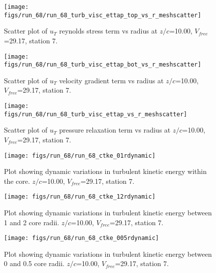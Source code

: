 \begin{figure}[H]
\centering
\texttt{[image: figs/run\_68/run\_68\_turb\_visc\_ettap\_top\_vs\_r\_meshscatter]}
\caption{Scatter plot of $
u_T$ reynolds stress term vs radius at $z/c$=10.00, $V_{free}$=29.17, station 7.}
\label{fig:run_68_turb_visc_ettap_top_vs_r_meshscatter}
\end{figure}


\begin{figure}[H]
\centering
\texttt{[image: figs/run\_68/run\_68\_turb\_visc\_ettap\_bot\_vs\_r\_meshscatter]}
\caption{Scatter plot of $
u_T$ velocity gradient term vs radius at $z/c$=10.00, $V_{free}$=29.17, station 7.}
\label{fig:run_68_turb_visc_ettap_bot_vs_r_meshscatter}
\end{figure}


\begin{figure}[H]
\centering
\texttt{[image: figs/run\_68/run\_68\_turb\_visc\_ettap\_vs\_r\_meshscatter]}
\caption{Scatter plot of $
u_T$ pressure relaxation term vs radius at $z/c$=10.00, $V_{free}$=29.17, station 7.}
\label{fig:run_68_turb_visc_ettap_vs_r_meshscatter}
\end{figure}


\begin{figure}[H]
\centering
\texttt{[image: figs/run\_68/run\_68\_ctke\_01rdynamic]}
\caption{Plot showing dynamic variations in turbulent kinetic energy within the core. $z/c$=10.00, $V_{free}$=29.17, station 7.}
\label{fig:run_68_ctke_01rdynamic}
\end{figure}


\begin{figure}[H]
\centering
\texttt{[image: figs/run\_68/run\_68\_ctke\_12rdynamic]}
\caption{Plot showing dynamic variations in turbulent kinetic energy between 1 and 2 core radii. $z/c$=10.00, $V_{free}$=29.17, station 7.}
\label{fig:run_68_ctke_12rdynamic}
\end{figure}


\begin{figure}[H]
\centering
\texttt{[image: figs/run\_68/run\_68\_ctke\_005rdynamic]}
\caption{Plot showing dynamic variations in turbulent kinetic energy between 0 and 0.5 core radii. $z/c$=10.00, $V_{free}$=29.17, station 7.}
\label{fig:run_68_ctke_005rdynamic}
\end{figure}


